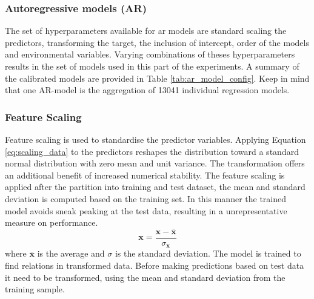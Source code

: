 \subsubsection{Autoregressive models (AR)}
The set of hyperparameters available for ar models are
standard scaling the predictors, transforming the target, the inclusion of intercept, order of the models and environmental variables. Varying combinations of theses hyperparameters results in the set of models used in this part of the experiments. 
A summary of the calibrated models are provided in Table \ref{tab:ar_model_config}. Keep in mind that one AR-model is the aggregation of 13041 individual regression models.  


\subsubsection{Feature Scaling} \label{sec:scaling_predictors}
Feature scaling is used to standardise the predictor variables.
Applying Equation \ref{eq:scaling_data} to the predictors reshapes the distribution toward a standard normal distribution with zero mean and unit variance. 
The transformation offers an additional benefit of increased numerical stability. %
The feature scaling is applied after the partition into training and test dataset, the mean and standard deviation is computed based on the training set. In this manner the trained model avoids sneak peaking at the test data, resulting in a unrepresentative measure on performance.
\begin{equation} \label{eq:scaling_data}
    \mathbf{x} = \frac{\mathbf{x} - \bar{\mathbf{x}}}{\sigma_{\mathbf{x}}}
\end{equation}
where $\bar{\mathbf{x}}$ is the average and $\sigma$ is the standard deviation. The model is trained to find relations in transformed data. Before making predictions based on test data it need to be transformed, using the mean and standard deviation from the training sample.

